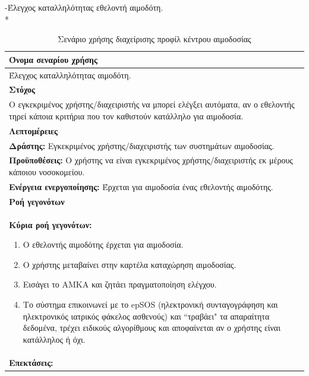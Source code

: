 -Έλεγχος καταλληλότητας εθελοντή αιμοδότη.
\\*
\begin{table}[H]
	\begin{center}
	    \begin{tabular}{|p{\dimexpr \linewidth-2\tabcolsep}|}
	    \hline
	    \rowcolor{grayy}
	    \textbf{Όνομα σεναρίου χρήσης}
	    \\ \hline    
	    Έλεγχος καταλληλότητας αιμοδότη.
	     \\ \hline
	    \rowcolor{grayy}
	    \textbf{\textbf{Στόχος}}
	    \\ \hline
	 	 Ο εγκεκριμένος χρήστης/διαχειριστής να μπορεί ελέγξει αυτόματα, αν ο εθελοντής τηρεί κάποια κριτήρια που τον καθιστούν κατάλληλο για αιμοδοσία. 
	    \\ \hline
	    \rowcolor{grayy}
	    \textbf{Λεπτομέρειες}
	    \\ \hline
		\textbf{Δράστης:} Εγκεκριμένος χρήστης/διαχειριστής των συστημάτων αιμοδοσίας.
		\\*
		\textbf{Προϋποθέσεις:} Ο χρήστης να είναι εγκεκριμένος χρήστης/διαχειριστής εκ μέρους κάποιου νοσοκομείου.
		\\*
		\textbf{Ενέργεια ενεργοποίησης:} Έρχεται για αιμοδοσία ένας εθελοντής αιμοδότης.
		\\ \hline
		\rowcolor{grayy}    
	    \textbf{Ροή γεγονότων}
	    \\ \hline
		\textbf{Κύρια ροή γεγονότων:}
		\begin{enumerate}
			\item	 Ο εθελοντής αιμοδότης έρχεται για αιμοδοσία.
			\item Ο χρήστης μεταβαίνει στην καρτέλα καταχώρηση αιμοδοσίας.
			\item Εισάγει το ΑΜΚΑ και ζητάει πραγματοποίηση ελέγχου.
			\item Το σύστημα επικοινωνεί με το epSOS (ηλεκτρονική συνταγογράφηση και ηλεκτρονικός ιατρικός φάκελος ασθενούς) και ``τραβάει" τα απαραίτητα δεδομένα, τρέχει ειδικούς αλγορίθμους και αποφαίνεται αν ο χρήστης είναι κατάλληλος ή όχι.
		\end{enumerate}
		\\ \hline
		\textbf{Επεκτάσεις:}
		   \\ \hline
	    \end{tabular}
	    \caption{Σενάριο χρήσης διαχείρισης προφίλ κέντρου αιμοδοσίας}
	    \label{tab:check_donor_eligibility}
	\end{center}
\end{table}	


